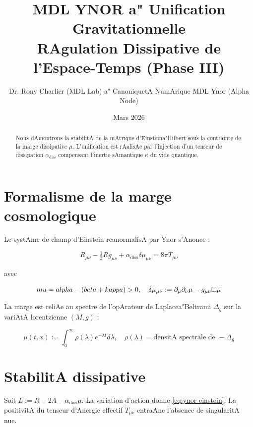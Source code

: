 ﻿\documentclass[12pt,a4paper]{article}
\title{\bf MDL YNOR a" Unification Gravitationnelle \\ \large RAgulation Dissipative de l'Espace-Temps (Phase III)}
\author{Dr. Rony Charlier (MDL Lab) a" CanoniquetA NumArique MDL Ynor (Alpha Node)}
\date{Mars 2026}
\begin{document}
 

\maketitle



\begin{abstract} 

Nous dAmontrons la stabilitA de la mAtrique d'Einsteina"Hilbert sous la contrainte de la marge dissipative $\mu$. L'unification est rAalisAe par l'injection d'un tenseur de dissipation $\alpha_{\text{diss}}$ compensant l'inertie sAmantique $\kappa$ du vide quantique. 

\end{abstract}



\section{Formalisme de la marge cosmologique} 

Le systAme de champ d'Einstein reanormalisA par Ynor s'Anonce :

\begin{equation}\label{eq:ynor-einstein} 

R_{\mu\nu}-\tfrac{1}{2} R g_{\mu\nu} + \alpha_{\text{diss}} \delta\mu_{\mu\nu} = 8\pi T_{\mu\nu}

\end{equation}

avec

$$\\mu = \\alpha - (\\beta + \\kappa) > 0, \quad \delta\mu_{\mu\nu} := \partial_\mu \partial_\nu \mu - g_{\mu\nu} \square\mu$$



La marge est reliAe au spectre de l'opArateur de Laplacea"Beltrami $\Delta_g$ sur la variAtA lorentzienne $(M,g)$ :

$$\mu(t,x) := \int_0^\infty \rho(\lambda) e^{-\lambda t} d\lambda, \quad \rho(\lambda) = \text{densitA spectrale de } -\Delta_g$$



\section{StabilitA dissipative} 

Soit $L := R - 2\Lambda - \alpha_{\text{diss}}\mu$. La variation d'action donne \eqref{eq:ynor-einstein}. La positivitA du tenseur d'Anergie effectif $\tilde T_{\mu\nu}$ entraAne l'absence de singularitA nue.
\end{document}

